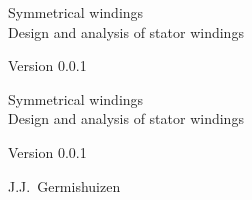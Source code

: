 \documentclass[10pt,a4paper]{book}
\newcommand{\theversion}{0.0.1}
\newcommand{\thedate}{}
\begin{document}
\thispagestyle{empty}

\begin{flushright}
\vspace*{2.0in}

\begin{spacing}{3}
{\huge Symmetrical windings}\\
{\Large Design and analysis of stator windings}
\end{spacing}

\vspace{0.25in}

Version \theversion

\thedate

\vfill

\end{flushright}


\blankpage
\blankpage

\pagebreak
\thispagestyle{empty}

\begin{flushright}
\vspace*{2.0in}

\begin{spacing}{3}
{\huge Symmetrical windings}\\
{\Large Design and analysis of stator windings}
\end{spacing}

\vspace{0.25in}

Version \theversion

\thedate

\vspace{1in}


{\Large
J.J.~Germishuizen\\
}


\vspace{0.5in}



\vfill

\end{flushright}
\end{document}
